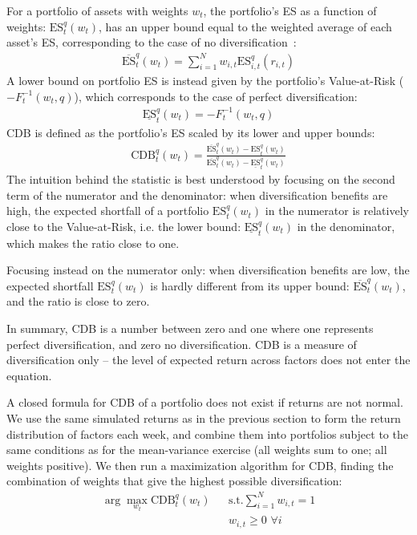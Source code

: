 For a portfolio of assets with weights $w_t$, the portfolio's ES as a function of weights: $\text{ES}_t^q(w_t)$, has an upper bound equal to the weighted average of each asset's ES, corresponding to the case of no diversification~\autocite{Artzner1999}:
\begin{align}
  \overline{\text{ES}}_t^q(w_t) = \sum_{i=1}^N w_{i,t} \text{ES}_{i,t}^q(r_{i,t})
\end{align}
A lower bound on portfolio ES is instead given by the portfolio's Value-at-Risk ($-F_{t}^{-1}(w_t, q)$), which corresponds to the case of perfect diversification:
\begin{align}
  \underline{\text{ES}}_t^q(w_t) = -F_{t}^{-1}(w_t, q)
\end{align}
CDB is defined as the portfolio's ES scaled by its lower and upper bounds:
\begin{align}
  \text{CDB}_t^q(w_t) = \frac{\overline{\text{ES}}_t^q(w_t) - \text{ES}_t^q(w_t)}{\overline{\text{ES}}_t^q(w_t) - \underline{\text{ES}}_t^q(w_t)}
\end{align}
The intuition behind the statistic is best understood by focusing on the second term of the numerator and the denominator: when diversification benefits are high, the expected shortfall of a portfolio $\text{ES}_t^q(w_t)$ in the numerator is relatively close to the Value-at-Risk, i.e. the lower bound: $\underline{\text{ES}}_t^q(w_t)$ in the denominator, which makes the ratio close to one. 

Focusing instead on the numerator only: when diversification benefits are low, the expected shortfall $\text{ES}_t^q(w_t)$ is hardly different from its upper bound: $\overline{\text{ES}}_t^q(w_t)$, and the ratio is close to zero.

In summary, CDB is a number between zero and one where one represents perfect diversification, and zero no diversification. CDB is a measure of diversification only -- the level of expected return across factors does not enter the equation.

A closed formula for CDB of a portfolio does not exist if returns are not normal. We use the same simulated returns as in the previous section to form the return distribution of factors each week, and combine them into portfolios subject to the same conditions as for the mean-variance exercise (all weights sum to one; all weights positive). We then run a maximization algorithm for CDB, finding the combination of weights that give the highest possible diversification:
\begin{align*}
  \arg\!\max_{w_t} \text{CDB}_t^q(w_t)
    && \text{s.t.} \sum_{i=1}^N w_{i,t} = 1 \\
    && w_{i,t} \ge 0 \,\, \forall i
\end{align*}

